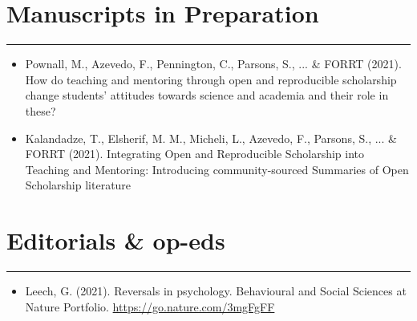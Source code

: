\documentclass[letterpaper]{article}
\begin{document}
\section*{\color{Brown}Manuscripts in Preparation}
\vspace{-.5em}
\hrule
\vspace{1em}
\begin{itemize}
\vspace{0.25em}

\item[]{\noindent Pownall, M., Azevedo, F., Pennington, C., Parsons, S., ... \& FORRT (2021). How do teaching and mentoring through open and reproducible scholarship change students' attitudes towards science and academia and their role in these?}

\item[]{\noindent Kalandadze, T., Elsherif, M. M.,  Micheli, L., Azevedo, F., Parsons, S., ... \& FORRT (2021). Integrating Open and Reproducible Scholarship into Teaching and Mentoring: Introducing community-sourced Summaries of Open Scholarship literature}

\end{itemize}










\section*{\color{Brown}Editorials \& op-eds}
\vspace{-.5em}
\hrule
\vspace{1em}
\begin{itemize}
\vspace{0.25em}

\item[]{\noindent Leech, G. (2021). Reversals in psychology. Behavioural and Social Sciences at Nature Portfolio. \href{https://go.nature.com/3mgFgFF}{\color{BlueViolet}https://go.nature.com/3mgFgFF}}
 

\end{itemize}
\end{document}
